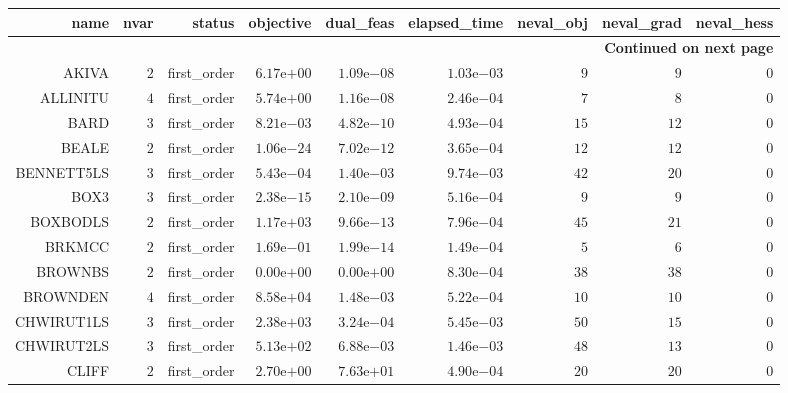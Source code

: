 \begin{longtable}{rrrrrrrrr}
\hline
name & nvar & status & objective & dual\_feas & elapsed\_time & neval\_obj & neval\_grad & neval\_hess \\\hline
\endhead
\hline
\multicolumn{9}{r}{{\bfseries Continued on next page}}\\
\hline
\endfoot
\endlastfoot
AKIVA & \(     2\) & first\_order & \( 6.17\)e\(+00\) & \( 1.09\)e\(-08\) & \( 1.03\)e\(-03\) & \(     9\) & \(     9\) & \(     0\) \\
ALLINITU & \(     4\) & first\_order & \( 5.74\)e\(+00\) & \( 1.16\)e\(-08\) & \( 2.46\)e\(-04\) & \(     7\) & \(     8\) & \(     0\) \\
BARD & \(     3\) & first\_order & \( 8.21\)e\(-03\) & \( 4.82\)e\(-10\) & \( 4.93\)e\(-04\) & \(    15\) & \(    12\) & \(     0\) \\
BEALE & \(     2\) & first\_order & \( 1.06\)e\(-24\) & \( 7.02\)e\(-12\) & \( 3.65\)e\(-04\) & \(    12\) & \(    12\) & \(     0\) \\
BENNETT5LS & \(     3\) & first\_order & \( 5.43\)e\(-04\) & \( 1.40\)e\(-03\) & \( 9.74\)e\(-03\) & \(    42\) & \(    20\) & \(     0\) \\
BOX3 & \(     3\) & first\_order & \( 2.38\)e\(-15\) & \( 2.10\)e\(-09\) & \( 5.16\)e\(-04\) & \(     9\) & \(     9\) & \(     0\) \\
BOXBODLS & \(     2\) & first\_order & \( 1.17\)e\(+03\) & \( 9.66\)e\(-13\) & \( 7.96\)e\(-04\) & \(    45\) & \(    21\) & \(     0\) \\
BRKMCC & \(     2\) & first\_order & \( 1.69\)e\(-01\) & \( 1.99\)e\(-14\) & \( 1.49\)e\(-04\) & \(     5\) & \(     6\) & \(     0\) \\
BROWNBS & \(     2\) & first\_order & \( 0.00\)e\(+00\) & \( 0.00\)e\(+00\) & \( 8.30\)e\(-04\) & \(    38\) & \(    38\) & \(     0\) \\
BROWNDEN & \(     4\) & first\_order & \( 8.58\)e\(+04\) & \( 1.48\)e\(-03\) & \( 5.22\)e\(-04\) & \(    10\) & \(    10\) & \(     0\) \\
CHWIRUT1LS & \(     3\) & first\_order & \( 2.38\)e\(+03\) & \( 3.24\)e\(-04\) & \( 5.45\)e\(-03\) & \(    50\) & \(    15\) & \(     0\) \\
CHWIRUT2LS & \(     3\) & first\_order & \( 5.13\)e\(+02\) & \( 6.88\)e\(-03\) & \( 1.46\)e\(-03\) & \(    48\) & \(    13\) & \(     0\) \\
CLIFF & \(     2\) & first\_order & \( 2.70\)e\(+00\) & \( 7.63\)e\(+01\) & \( 4.90\)e\(-04\) & \(    20\) & \(    20\) & \(     0\) \\

\end{longtable}
